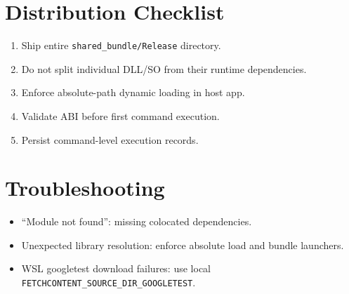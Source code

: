 \documentclass[11pt,a4paper]{article}
\begin{document}
\section{Distribution Checklist}
\begin{enumerate}
  \item Ship entire \texttt{shared\_bundle/Release} directory.
  \item Do not split individual DLL/SO from their runtime dependencies.
  \item Enforce absolute-path dynamic loading in host app.
  \item Validate ABI before first command execution.
  \item Persist command-level execution records.
\end{enumerate}

\section{Troubleshooting}
\begin{itemize}
  \item ``Module not found'': missing colocated dependencies.
  \item Unexpected library resolution: enforce absolute load and bundle launchers.
  \item WSL googletest download failures: use local \texttt{FETCHCONTENT\_SOURCE\_DIR\_GOOGLETEST}.
\end{itemize}
\end{document}
